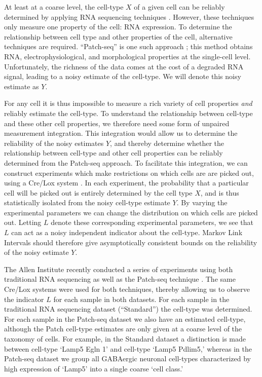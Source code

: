 \documentclass{article}
\theoremstyle{definition}
\begin{document}
At least at a coarse level, the cell-type $X$ of a given cell can be reliably determined by applying RNA sequencing techniques \cite{okaty2011cell}.  However, these techniques only measure one property of the cell: RNA expression. To determine the relationship between cell type and other properties of the cell, alternative techniques are required.  ``Patch-seq'' is one such approach \cite{cadwell2016electrophysiological}; this method obtains RNA, electrophysiological, and morphological properties at the single-cell level.  Unfortunately, the richness of the data comes at the cost of a degraded RNA signal, leading to a noisy estimate of the cell-type.  We will denote this noisy estimate as $Y$.  

For any cell it is thus impossible to measure a rich variety of cell properties \emph{and} reliably estimate the cell-type.  To understand the relationship between cell-type and these other cell properties, we therefore need some form of unpaired measurement integration.  This integration would allow us to determine the reliability of the noisy estimates $Y$, and thereby determine whether the relationship between cell-type and other cell properties can be reliably determined from the Patch-seq approach.  To facilitate this integration, we can construct experiments which make restrictions on which cells are are picked out, using a Cre/Lox system \cite{tasic2017shared}.  In each experiment, the probability that a particular cell will be picked out is entirely determined by the cell type $X$, and is thus statistically isolated from the noisy cell-type estimate $Y$.  By varying the experimental parameters we can change the distribution on which cells are picked out.  Letting $L$ denote these corresponding experimental parameters, we see that $L$ can act as a noisy independent indicator about the cell-type.  Markov Link Intervals should therefore give asymptotically consistent bounds on the reliability of the noisy estimate $Y$.  

The Allen Institute recently conducted a series of experiments using both traditional RNA sequencing as well as the Patch-seq technique \cite{tasic2017shared}.  The same Cre/Lox systems were used for both techniques, thereby allowing us to observe the indicator $L$ for each sample in both datasets.  For each sample in the traditional RNA sequencing dataset (``Standard'') the cell-type was determined.  For each sample in the Patch-seq dataset we also have an estimated cell-type, although the Patch cell-type estimates are only given at a coarse level of the taxonomy of cells.  For example, in the Standard dataset a distinction is made between cell-type `Lamp5 Egln 1' and cell-type `Lamp5 Pdlim5,' whereas in the Patch-seq dataset we group all GABAergic neuronal cell-types characterized by high expression of `Lamp5' into a single coarse `cell class.'
\end{document}
